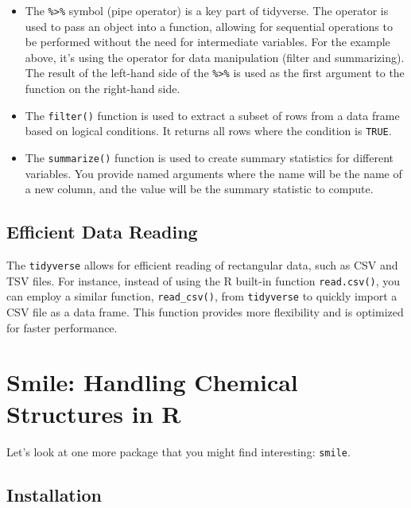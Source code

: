 \documentclass[
]{book}
\begin{document}
\begin{itemize}
\item
  The \texttt{\%\textgreater{}\%} symbol (pipe operator) is a key part of tidyverse. The operator is used to pass an object into a function, allowing for sequential operations to be performed without the need for intermediate variables. For the example above, it's using the operator for data manipulation (filter and summarizing). The result of the left-hand side of the \texttt{\%\textgreater{}\%} is used as the first argument to the function on the right-hand side.
\item
  The \texttt{filter()} function is used to extract a subset of rows from a data frame based on logical conditions. It returns all rows where the condition is \texttt{TRUE}.
\item
  The \texttt{summarize()} function is used to create summary statistics for different variables. You provide named arguments where the name will be the name of a new column, and the value will be the summary statistic to compute.
\end{itemize}

\hypertarget{efficient-data-reading}{%
\subsection{Efficient Data Reading}\label{efficient-data-reading}}

The \texttt{tidyverse} allows for efficient reading of rectangular data, such as CSV and TSV files. For instance, instead of using the R built-in function \texttt{read.csv()}, you can employ a similar function, \texttt{read\_csv()}, from \texttt{tidyverse} to quickly import a CSV file as a data frame. This function provides more flexibility and is optimized for faster performance.

\hypertarget{smile-handling-chemical-structures-in-r}{%
\section{Smile: Handling Chemical Structures in R}\label{smile-handling-chemical-structures-in-r}}

Let's look at one more package that you might find interesting: \texttt{smile}.

\hypertarget{installation}{%
\subsection{Installation}\label{installation}}
\end{document}
